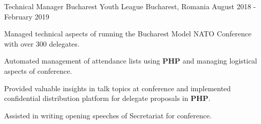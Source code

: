 
\begin{cventries}
  \cventry
    {Technical Manager}
    {Bucharest Youth League}
    {Bucharest, Romania}
    {August 2018 - February 2019}
    {
      \begin{cvitems}
        \item {Managed technical aspects of running the Bucharest Model NATO Conference with over 300 delegates.}
        \item {Automated management of attendance lists using \textbf{PHP} and managing logistical aspects of conference.}
        \item {Provided valuable insights in talk topics at conference and implemented confidential distribution platform for delegate proposals in \textbf{PHP}.}
        \item {Assisted in writing opening speeches of Secretariat for conference.}
      \end{cvitems}
    }
\end{cventries}
